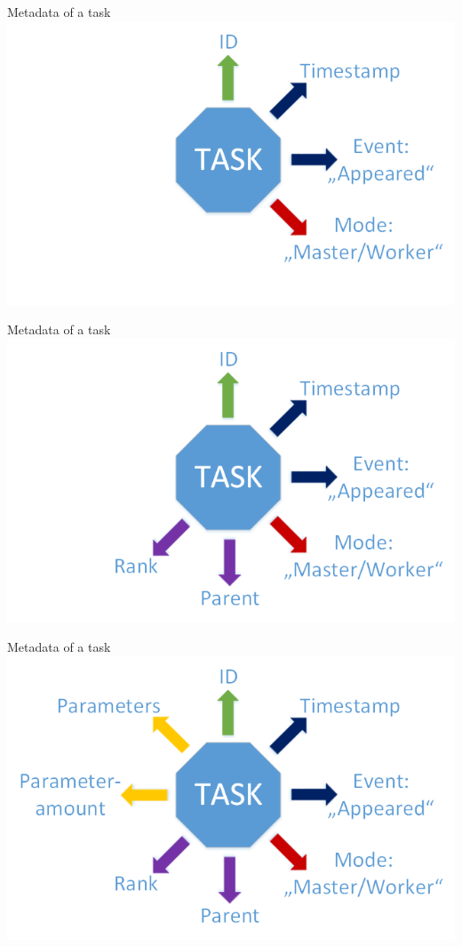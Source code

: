 	\begin{frame}{Metadata of a task}
	\includegraphics[width=1.0\textwidth]{images/Task/zeichnungstep2.png}
	\end{frame}
	
	\begin{frame}{Metadata of a task}
	\includegraphics[width=1.0\textwidth]{images/Task/zeichnungstep1.png}
	\end{frame}
	
	\begin{frame}{Metadata of a task}
	\includegraphics[width=1.0\textwidth]{images/Task/Zeichnung1.png}
	\end{frame}
	
